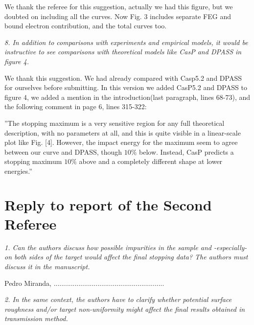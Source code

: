 \documentclass[a4paper,10pt]{article}
\begin{document}
\vspace{0.1cm}
{\color{red} We thank the referee for this suggestion, actually we had this figure, but we doubted on including all the curves. Now Fig. 3 includes separate FEG and bound electron contribution, and the total curves too.}

\vspace{0.35cm}
\textsl{8. In addition to comparisons with experiments and empirical 
models, it would be instructive to see comparisons with theoretical 
models like CasP and DPASS in figure 4.}

\vspace{0.1cm}
{\color{red} We thank this suggestion. We had already compared with Casp5.2 and DPASS for ourselves before submitting. In this version we added CasP5.2 and DPASS to figure 4, we added a mention in the introduction(last paragraph, lines 68-73), and the following comment in page 6, lines 315-322:}

{\small ''The stopping maximum is a very sensitive region for any full theoretical description, with no parameters at all, and this is quite visible in a linear-scale plot like Fig. [4]. However, the impact energy for the maximum seem to agree between our curve and DPASS, though $10 \%$ below. Instead, CasP predicts a stopping maximum $10 \%$ above and a completely different shape at lower energies.''}


\newpage
\section{Reply to report of the Second Referee}

\textsl{1. Can the authors discuss how possible impurities in the sample and -especially- on both sides of the target would affect the final
stopping data? The authors must discuss it in the manuscript.}

\vspace{0.1cm}
{\color{red} Pedro Miranda, ..........................................................}
\vspace{0.2cm}


\vspace{0.25cm}
\textsl{2. In the same context, the authors have to clarify whether potential
surface roughness and/or target non-uniformity might affect the final
results obtained in transmission method.}
\end{document}
